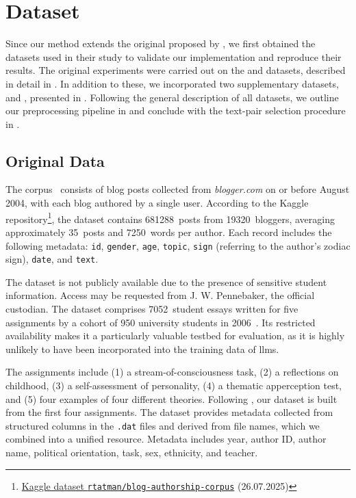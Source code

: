 \section{Dataset}
\label{sec:dataset}

Since our method extends the original \impAppr{} proposed by \citet{koppel_determining_2014}, we first obtained the datasets used in their study to validate our implementation and reproduce their results. 
The original experiments were carried out on the \dataBlog{} and \dataStudent{} datasets, described in detail in .
In addition to these, we incorporated two supplementary datasets, \dataPan{} and \dataGutenberg{}, presented in . 
Following the general description of all datasets, we outline our preprocessing pipeline in  and conclude with the text-pair selection procedure in .


\subsection{Original Data}
\label{subsec:original_data}

The \dataBlog{} corpus~\citep{blog_dataset_2006} consists of blog posts collected from \textit{blogger.com} on or before August 2004, with each blog authored by a single user.
According to the Kaggle repository\footnote{\href{https://www.kaggle.com/datasets/rtatman/blog-authorship-corpus?resource=download}{Kaggle dataset \texttt{rtatman/blog-authorship-corpus}} (26.07.2025)}, the dataset contains \num{681288}~posts from \num{19320}~bloggers, averaging approximately 35~posts and \num{7250}~words per author.
Each record includes the following metadata: \texttt{id}, \texttt{gender}, \texttt{age}, \texttt{topic}, 
\texttt{sign} (referring to the author's zodiac sign), \texttt{date}, and \texttt{text}.

The \dataStudent{} dataset is not publicly available due to the presence of sensitive student information. 
Access may be requested from J. W. Pennebaker, the official custodian.
The dataset comprises \num{7052}~student essays written for five assignments by a cohort of 950 university students in 2006~\citep{koppel_determining_2014}.
Its restricted availability makes it a particularly valuable testbed for evaluation, as it is highly unlikely to have been incorporated into the training data of \acp{llm}.

The assignments include (1) a stream-of-consciousness task, (2) a reflections on childhood, (3) a self-assessment of personality, (4) a thematic apperception test, and (5) four examples of four different theories.
Following \citet{koppel_determining_2014}, our dataset is built from the first four assignments. 
The dataset provides metadata collected from structured columns in the \texttt{.dat} files and derived from file names, which we combined into a unified resource. 
Metadata includes year, author ID, author name, political orientation, task, sex, ethnicity, and teacher.


